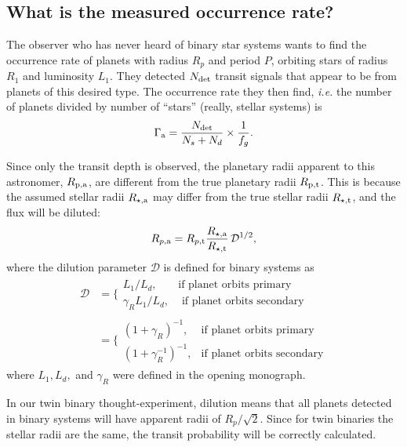 \documentclass{emulateapj}
\begin{document}
\subsection{What is the measured occurrence rate?}

The observer who has never heard of binary star systems wants to find the 
occurrence rate of planets with radius $R_p$ and period $P$, orbiting stars of 
radius $R_1$ and luminosity $L_1$.
They detected $N_{\rm det}$ transit signals that appear to be from planets of 
this desired type.
The occurrence rate they then find, {\it i.e.} the number of planets divided 
by number of ``stars'' (really, stellar systems) is
\begin{equation}
\Gamma_{\rm a } = \frac{N_{\rm det}}{N_s + N_d} \times \frac{1}{f_g}.
\end{equation}

Since only the transit depth is observed, the planetary radii apparent to this 
astronomer, $R_{\rm p, a}$, are different from the true planetary radii 
$R_{\rm p, t}$. 
This is because the assumed stellar radii $R_{\star,{\rm a}}$ may differ from 
the true stellar radii $R_{\star,{\rm t}}$, and the flux will be diluted:
\begin{equation}
R_{p,{\rm a}} = R_{p,{\rm t}} 
\frac{R_{\star,{\rm a}}}
		 {R_{\star,{\rm t}}}
		 \,\mathcal{D}^{1/2},
\end{equation}
where the dilution parameter $\mathcal{D}$ is defined for binary systems as
\begin{align}
\mathcal{D} &= 
\Bigg\{\begin{array}{lr}
L_1 / L_d, & \text{if\ planet\ orbits\ primary}\\
\gamma_R L_1 / L_d, & \text{\ if\ planet\ orbits\ secondary}
\end{array} \nonumber\\
&=
\Bigg\{\begin{array}{lr}
(1+\gamma_R)^{-1}, & \text{if\ planet\ orbits\ primary}\\
(1 + \gamma_R^{-1})^{-1}, & \text{if\ planet\ orbits\ secondary}
\end{array} 
\label{eq:dilution}
\end{align}
where $L_1, L_d,$ and $\gamma_R$ were defined in the opening monograph.


In our twin binary thought-experiment, dilution means that all planets 
detected in binary systems will have apparent radii of $R_p/\sqrt{2}$.
Since for twin binaries the stellar radii are the same, the transit 
probability will be correctly calculated.
\end{document}
